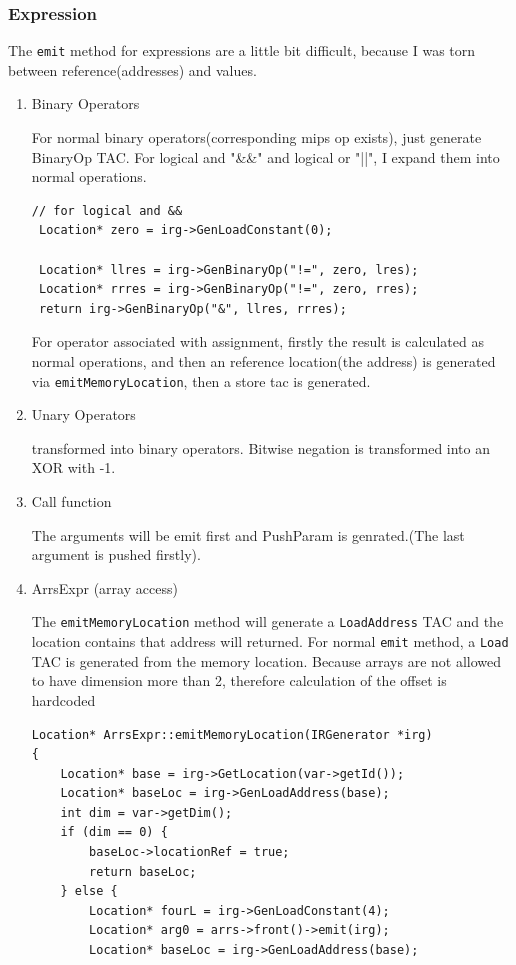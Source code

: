 \documentclass[11pt]{article}
\begin{document}
\subsubsection{Expression}
\label{sec:orgheadline25}
The \texttt{emit} method for expressions are a little bit difficult, because I was
torn between reference(addresses) and values.

\begin{enumerate}
\item Binary Operators

For normal binary operators(corresponding mips op exists), just generate
BinaryOp TAC. For logical and "\&\&" and logical or "||", I expand them
into normal operations.
\begin{verbatim}
// for logical and &&
 Location* zero = irg->GenLoadConstant(0);

 Location* llres = irg->GenBinaryOp("!=", zero, lres);
 Location* rrres = irg->GenBinaryOp("!=", zero, rres);
 return irg->GenBinaryOp("&", llres, rrres);
\end{verbatim}
 For operator associated with assignment, firstly the result is
calculated as normal operations, and then an reference location(the
address) is generated via \texttt{emitMemoryLocation}, then a store tac is
generated.

\item Unary Operators

transformed into binary operators. Bitwise negation is transformed into
an XOR with -1.

\item Call function

The arguments will be emit first and PushParam is genrated.(The last
argument is pushed firstly).

\item ArrsExpr (array access)

The \texttt{emitMemoryLocation} method will generate a \texttt{LoadAddress} TAC and the
location contains that address will returned. For normal \texttt{emit} method, a
\texttt{Load} TAC is generated from the memory location. Because arrays are not
allowed to have dimension more than 2, therefore calculation of the
offset is hardcoded
\begin{verbatim}
Location* ArrsExpr::emitMemoryLocation(IRGenerator *irg)
{
    Location* base = irg->GetLocation(var->getId());
    Location* baseLoc = irg->GenLoadAddress(base);
    int dim = var->getDim();
    if (dim == 0) {
        baseLoc->locationRef = true;
        return baseLoc;
    } else {
        Location* fourL = irg->GenLoadConstant(4);
        Location* arg0 = arrs->front()->emit(irg);
        Location* baseLoc = irg->GenLoadAddress(base);


\end{verbatim}
\end{enumerate}
\end{document}
